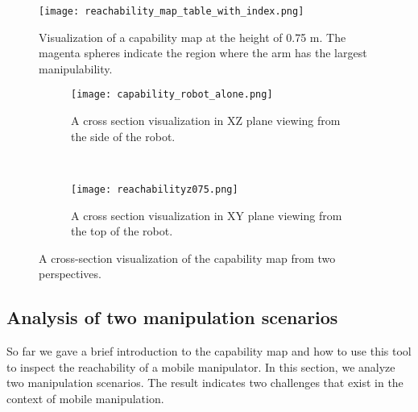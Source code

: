 \begin{figure}[!htbp]
\centering
\texttt{[image: reachability\_map\_table\_with\_index.png]}
\captionsetup{justification=raggedright}
\caption{Visualization of a capability map at the height  of 0.75 m. The magenta spheres indicate the region where the arm has the largest manipulability.}
\label{fig:cmap}       %
\end{figure} 

\begin{figure}[!htbp]
    \centering
    \begin{subfigure}[b]{0.45\textwidth}
        \texttt{[image: capability\_robot\_alone.png]}
        \caption{A cross section visualization in XZ plane viewing from the side of the robot. }
        \label{fig:cmap_view1}
    \end{subfigure}
    ~ %
    \begin{subfigure}[b]{0.45\textwidth}
        \texttt{[image: reachabilityz075.png]}
        \caption{A cross section visualization in XY plane viewing from the top of the robot. }
        \label{fig:cmap_view2}
    \end{subfigure}
    \caption{ A cross-section visualization of the capability map from two perspectives. }\label{fig:cmap_view}
\end{figure}



\subsection{Analysis of two manipulation scenarios} 
\label{sec:analysis2scenarios}
So far we gave a brief introduction to the capability map and how to use this tool to inspect the reachability of a mobile manipulator. In this section, we analyze two manipulation scenarios. The result indicates two challenges that exist in the context of mobile manipulation.  

